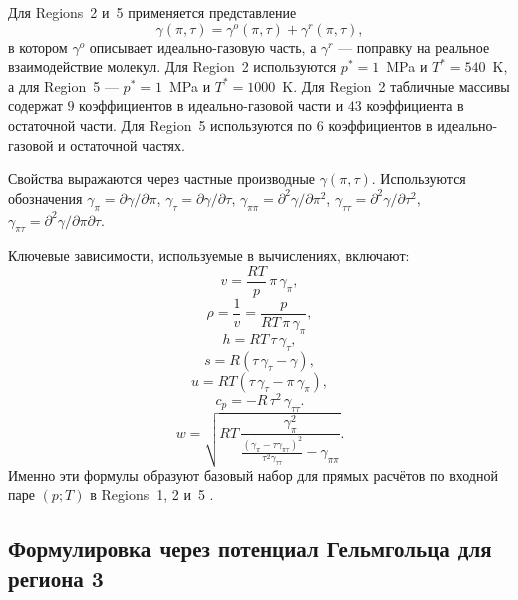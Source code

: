 Для Regions~2 и~5 применяется представление
\begin{equation}
\gamma(\pi,\tau) = \gamma^{o}(\pi,\tau) + \gamma^{r}(\pi,\tau),
\end{equation}
в котором $\gamma^{o}$ описывает идеально-газовую часть,
а $\gamma^{r}$ --- поправку на реальное взаимодействие молекул.
Для Region~2 используются
$p^{*}=1$~MPa и $T^{*}=540$~K,
а для Region~5 ---
$p^{*}=1$~MPa и $T^{*}=1000$~K.
Для Region~2 табличные массивы содержат
$9$ коэффициентов в идеально-газовой части
и $43$ коэффициента в остаточной части.
Для Region~5 используются по $6$ коэффициентов
в идеально-газовой и остаточной частях.

Свойства выражаются через частные производные $\gamma(\pi,\tau)$.
Используются обозначения
$\gamma_{\pi} = \partial \gamma/\partial \pi$,
$\gamma_{\tau} = \partial \gamma/\partial \tau$,
$\gamma_{\pi\pi} = \partial^{2}\gamma/\partial \pi^{2}$,
$\gamma_{\tau\tau} = \partial^{2}\gamma/\partial \tau^{2}$,
$\gamma_{\pi\tau} = \partial^{2}\gamma/\partial \pi \partial \tau$.

Ключевые зависимости, используемые в вычислениях, включают:
\begin{equation}
v = \frac{R T}{p}\,\pi\,\gamma_{\pi},
\end{equation}
\begin{equation}
\rho = \frac{1}{v} = \frac{p}{R T\,\pi\,\gamma_{\pi}},
\end{equation}
\begin{equation}
h = R T\,\tau\,\gamma_{\tau},
\end{equation}
\begin{equation}
s = R \left(\tau\,\gamma_{\tau} - \gamma\right),
\end{equation}
\begin{equation}
u = R T \left(\tau\,\gamma_{\tau} - \pi\,\gamma_{\pi}\right),
\end{equation}
\begin{equation}
c_{p} = -R\,\tau^{2}\,\gamma_{\tau\tau}.
\end{equation}
\begin{equation}
w = \sqrt{R T\,
\frac{\gamma_{\pi}^{2}}
{\frac{\left(\gamma_{\pi} - \tau\gamma_{\pi\tau}\right)^{2}}
{\tau^{2}\gamma_{\tau\tau}}
- \gamma_{\pi\pi}} }.
\end{equation}
Именно эти формулы образуют базовый набор
для прямых расчётов по входной паре $(p; T)$
в Regions~1, 2 и~5 \cite{iapws_if97_2012}.

\subsection{Формулировка через потенциал Гельмгольца для региона 3}

